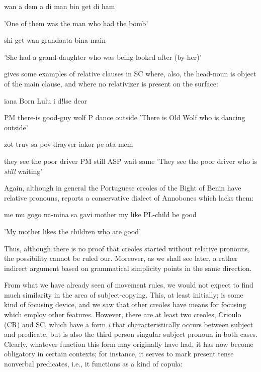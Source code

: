 \ea\label{ex:39}
 wan a dem a di man bin get di ham
\glt
\z

'One of them was the man who had the bomb'

\ea\label{ex:40}
 shi get wan grandaata bina main
\glt
\z

'She had a grand-daughter who was being looked after (by her)'

\citet[38]{Corne1977} gives some examples of relative clauses in SC where, also, the head-noun is object of the main clause, and where no rela\-tivizer is present on the surface:

\ea\label{ex:41}
 iana Born Lulu i d!lse deor
\glt
\z

PM there-is good-guy wolf P dance outside 'There is Old Wolf who is dancing outside'


\ea\label{ex:42}
 zot truv sa pov drayver iakor pe ata mem
\glt
\z

they see the poor driver PM still ASP wait same 'They see the poor driver who is \textit{still} waiting'

Again, although in general the Portuguese creoles of the Bight of Benin have relative pronouns, \citet[97]{Valkoff1966} reports a conserva\-tive dialect of Annobones which lacks them:

\ea\label{ex:43}
 me mu gogo na-mina sa gavi mother my like PL-child be good
\glt
\z

'My mother likes the children who are good'

Thus, although there is no proof that creoles started without relative pronouns, the possibility cannot be ruled our. Moreover, as we shall see later, a rather indirect argument based on grammatical sim\-plicity points in the same direction.

From what we have already seen of movement rules, we would not expect to find much similarity in the area of subject-copying. This, at least initially; is some kind of focusing device, and we saw that other creoles have means for focusing which employ other features. However, there are at least two creoles, Crioulo (CR) and SC, which have a form \textit{i} that characteristically occurs between subject and predicate, but is also the third person singular subject pronoun in both cases. Clearly, what\-ever function this form may originally have had, it has now become obligatory in certain contexts; for instance, it serves to mark present tense nonverbal predicates, i.e., it functions as a kind of copula:

